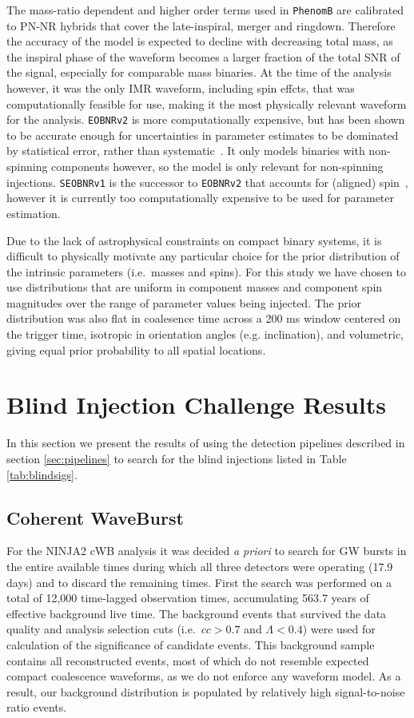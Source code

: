 \documentclass[12pt]{iopart}
\newcommand{\eob}{\texttt{EOBNRv2}\xspace}
\newcommand{\imr}{\texttt{PhenomB}\xspace}
\begin{document}
The mass-ratio dependent and higher order terms used in \imr are calibrated to 
PN-NR hybrids
that cover the late-inspiral, merger and ringdown. Therefore the accuracy of the
model is expected to decline with decreasing total mass, as the inspiral phase
of the waveform becomes a larger fraction of the total SNR of the signal,
especially for comparable mass binaries. At the time of the analysis however, 
it was the only IMR waveform, including spin effcts, that was computationally
feasible for use, making it the most physically relevant waveform for the 
analysis. \eob is more computationally expensive, but has been
shown to be accurate enough for uncertainties in parameter estimates to be
dominated by statistical error, rather than
systematic~\cite{Littenberg:2012uj}.  It only models binaries with non-spinning
components however, so the model is only relevant for non-spinning injections.
\texttt{SEOBNRv1} is the successor to \eob that accounts for
(aligned) spin~\cite{Taracchini:2012ig}, however it is currently too 
computationally expensive to be used for parameter estimation.

Due to the lack of astrophysical constraints on compact binary systems, it is
difficult to physically motivate any particular choice for the prior 
distribution of the intrinsic parameters (i.e.\ masses and spins).  For this 
study we have
chosen to use distributions that are uniform in component masses and component 
spin magnitudes over the range of parameter values being injected.  The prior
distribution was also flat in coalesence time across a 200 ms window centered
on the trigger time, isotropic in orientation angles (e.g. inclination), and
volumetric, giving equal prior probability to all spatial locations.

\section{Blind Injection Challenge Results}
\label{sec:searches}

In this section we present the results of using the detection pipelines 
described in section \ref{sec:pipelines} to search for the blind injections 
listed 
in Table \ref{tab:blindsigs}.

\subsection{Coherent WaveBurst}

For the NINJA2 cWB analysis 
it was decided \textit{a priori}
to search for GW bursts in the entire available 
times during which all three detectors were operating
(17.9 days) and to discard the remaining times.
First the search was performed on a total of 
12,000 time-lagged observation times, accumulating 563.7 years of effective 
background live time. The background events that survived the data quality and 
analysis selection cuts (i.e.\ ${cc}>0.7$ and ${\Lambda}<0.4$) 
were used for calculation of the significance of candidate events. This 
background sample contains all reconstructed events, most of which do 
not resemble expected compact coalescence waveforms, as we do not 
enforce any waveform model. As a result, our background distribution is 
populated by relatively high signal-to-noise ratio events.   
\end{document}
